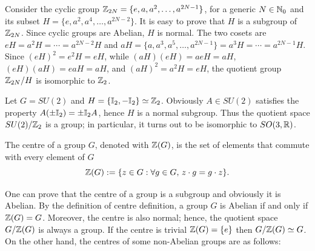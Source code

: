 \begin{ex}
    Consider the cyclic group $\mathbb{Z}_{2N} = \{e, a, a^2, \ldots, a^{2N-1}\}$, for a generic $N \in \mathbb{N}_0$ and its subset $H = \{e, a^2, a^4, \ldots, a^{2N-2}\}$. It is easy to prove that $H$ is a subgroup of $\mathbb{Z}_{2N}$. Since cyclic groups are Abelian, $H$ is normal. The two cosets are $eH = a^2H = \cdots = a^{2N-2}H$ and $aH = \{a, a^3, a^5, \ldots, a^{2N-1}\} = a^3H = \cdots = a^{2N-1}H$. Since $(eH)^2 = e^2H = eH$, while $(aH)(eH) = aeH = aH$, $(eH)(aH) = eaH = aH$, and $(aH)^2 = a^2H = eH$, the quotient group $\mathbb{Z}_{2N}/H$ is isomorphic to $\mathbb{Z}_2$.
\end{ex}
\begin{ex}
    Let $G = SU(2)$ and $H = \{\mathbb{I}_2, -\mathbb{I}_2\} \simeq \mathbb{Z}_2$. Obviously $A \in SU(2)$ satisfies the property $A(\pm \mathbb{I}_2) = \pm \mathbb{I}_2 A$, hence $H$ is a normal subgroup. Thus the quotient space $SU(2)/\mathbb{Z}_2$ is a group; in particular, it turns out to be isomorphic to $SO(3, \mathbb{R})$.
\end{ex}
\begin{defn}[centre]
    The centre of a group $G$, denoted with $\mathbb{Z}(G)$, is the set of elements that commute with every element of $G$
    \begin{equation}
        \mathbb{Z}(G) := \{z \in G : \forall g \in G,\,z \cdot g = g \cdot z\}.
    \end{equation}
\end{defn}
One can prove that the centre of a group is a subgroup and obviously it is Abelian. By the definition of centre definition, a group $G$ is Abelian if and only if $\mathbb{Z}(G) = G$. Moreover, the centre is also normal; hence, the quotient space $G/\mathbb{Z}(G)$ is always a group. If the centre is trivial $\mathbb{Z}(G) = \{e\}$ then $G/\mathbb{Z}(G) \simeq G$. On the other hand, the centres of some non-Abelian groups are as follows:
